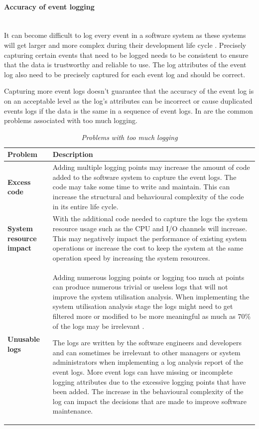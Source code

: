 \clearpage

\paragraph{Accuracy of event logging}\leavevmode\\
It can become difficult to log every event in a software system as these systems will get larger and more complex during their development life cycle \cite{Stojanov2017}. Precisely capturing certain events that need to be logged needs to be consistent to ensure that the data is trustworthy and reliable to use. The log attributes of the event log also need to be precisely captured for each event log and should be correct.\par Capturing more event logs doesn't guarantee that the accuracy of the event log is on an acceptable level as the log's attributes can be incorrect or cause duplicated events logs if the data is the same in a sequence of event logs. In  are the common problems associated with too much logging.

\begin{table}[!htb]
	\centering
	\caption[Problems with too much logging]
	{\textit{Problems with too much logging \cite{Zhu2015}}}
	\label{tbl:ch1_loggingTooMuch}
	\begin{tabularx}{\textwidth}{|l|X|}
		\hline \textbf{Problem}  & \textbf{Description} \\
		\hline \textbf{Excess code} & Adding multiple logging points may increase the amount of code added to the software system to capture the event logs. The code may take some time to write and maintain. This can increase the structural and behavioural complexity of the code in its entire life cycle. \\
		\hline \textbf{System resource impact} & With the additional code needed to capture the logs the system resource usage such as the CPU and I/O channels will increase. This may negatively impact the performance of existing system operations or increase the cost to keep the system at the same operation speed by increasing the system resources.\\
		\hline \textbf{Unusable logs} & Adding numerous logging points or logging too much at points can produce numerous trivial or useless logs that will not improve the system utilisation analysis. When implementing the system utilisation analysis stage the logs might need to get filtered more or modified to be more meaningful as much as $70\%$ of the logs may be irrelevant \cite{Fedaghi2010}. \par The logs are written by the software engineers and developers and can sometimes be irrelevant to other managers or system administrators when implementing a log analysis report of the event logs. More event logs can have missing or incomplete logging attributes due to the excessive logging points that have been added. The increase in the behavioural complexity of the log can impact the decisions that are made to improve software maintenance. \\
		\hline
	\end{tabularx}
\end{table}

